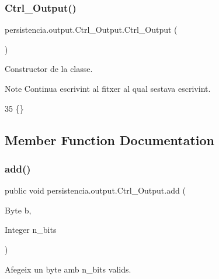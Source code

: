 \subsubsection{\texorpdfstring{Ctrl\+\_\+\+Output()}{Ctrl\_Output()}\hspace{0.1cm}{\footnotesize\ttfamily [2/2]}}
{\footnotesize\ttfamily persistencia.\+output.\+Ctrl\+\_\+\+Output.\+Ctrl\+\_\+\+Output (\begin{DoxyParamCaption}{ }\end{DoxyParamCaption})\hspace{0.3cm}{\ttfamily [inline]}}



Constructor de la classe. 

\begin{DoxyNote}{Note}
Continua escrivint al fitxer al qual s\textquotesingle{}estava escrivint. 
\end{DoxyNote}

\begin{DoxyCode}
35 \{\}
\end{DoxyCode}


\subsection{Member Function Documentation}
\mbox{\label{classpersistencia_1_1output_1_1Ctrl__Output_a8c5aa5a6acb5259faeb1c05c71ddd21c}} 
\subsubsection{\texorpdfstring{add()}{add()}\hspace{0.1cm}{\footnotesize\ttfamily [1/6]}}
{\footnotesize\ttfamily public void persistencia.\+output.\+Ctrl\+\_\+\+Output.\+add (\begin{DoxyParamCaption}\item[{Byte}]{b,  }\item[{Integer}]{n\+\_\+bits }\end{DoxyParamCaption})\hspace{0.3cm}{\ttfamily [inline]}}



Afegeix un byte amb n\+\_\+bits valids. 


